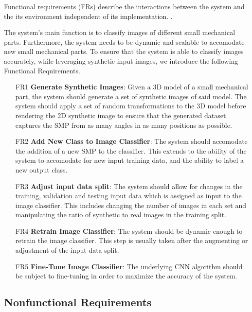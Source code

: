 Functional requirements (FRs) describe the interactions between the system and the its environment independent of its implementation. \cite{bruegge2004object}.

The system's main function is to classify images of different small mechanical parts. Furthermore, the system needs to be dynamic and scalable to accomodate new small mechanical parts. To ensure that the system is able to classify images accurately, while leveraging synthetic input images, we introduce the following Functional Requirements.

\begin{itemize}
  \item [FR1] \textbf{Generate Synthetic Images}: Given a 3D model of a small mechanical part, the system should generate a set of synthetic images of said model. The system should apply a set of random transformations to the 3D model before rendering the 2D synthetic image to ensure that the generated dataset captures the SMP from as many angles in as many positions as possible.

  \item [FR2] \textbf{Add New Class to Image Classifier}: The system should accomodate the addition of a new SMP to the classifier. This extends to the ability of the system to accomodate for new input training data, and the ability to label a new output class.

  \item [FR3] \textbf{Adjust input data split}: The system should allow for changes in the training, validation and testing input data which is assigned as input to the image classifier. This includes changing the number of images in each set and manipulating the ratio of synthetic to real images in the training split.

  \item [FR4] \textbf{Retrain Image Classifier}: The system should be dynamic enough to retrain the image classifier. This step is usually taken after the augmenting or adjustment of the input data split.

  \item [FR5] \textbf{Fine-Tune Image Classifier}: The underlying CNN algorithm should be subject to fine-tuning in order to maximize the accuracy of the system.
\end{itemize}

\subsection{Nonfunctional Requirements}

